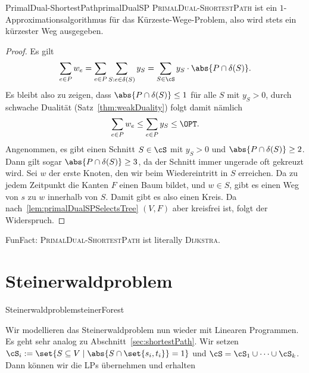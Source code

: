 \documentclass[language=ngerman,algolist]{TemplateLecture}
\begin{document}
\begin{thm}{PrimalDual-ShortestPath}{primalDualSP}
    \textsc{PrimalDual-ShortestPath} ist ein $1$-Approximationsalgorithmus für das Kürzeste-Wege-Problem, also wird stets ein kürzester Weg ausgegeben.
\end{thm}

\begin{proof}
    Es gilt 
    \begin{equation*}
        \sum_{e \in P} w_e = \sum_{e \in P} \sum_{S: e \in \delta(S)} y_S = \sum_{S \in \cS} y_S \cdot \abs{P \cap \delta(S)}. 
    \end{equation*}
    Es bleibt also zu zeigen, dass $\abs{P \cap \delta(S)} \leq 1$ für alle $S$ mit $y_S > 0$, durch schwache Dualität (Satz~\ref{thm:weakDuality}) folgt damit nämlich
    \begin{equation*}
        \sum_{e \in P} w_e \leq \sum_{e \in P} y_S \leq \OPT.
    \end{equation*}
    Angenommen, es gibt einen Schnitt $S \in \cS$ mit $y_S > 0$ und $\abs{P \cap \delta(S)} \geq 2$. Dann gilt sogar $\abs{P \cap \delta(S)} \geq 3$, da der Schnitt immer ungerade oft gekreuzt wird. Sei $w$ der erste Knoten, den wir beim Wiedereintritt in $S$ erreichen. Da zu jedem Zeitpunkt die Kanten $F$ einen Baum bildet, und $w \in S$, gibt es einen Weg von $s$ zu $w$ innerhalb von $S$. Damit gibt es also einen Kreis. Da nach~\ref{lem:primalDualSPSelectsTree} $(V, F)$ aber kreisfrei ist, folgt der Widerspruch. 
\end{proof}

FunFact: \textsc{PrimalDual-ShortestPath} ist literally \textsc{Dijkstra}.

\section{Steinerwaldproblem}

\begin{prob}{Steinerwaldproblem}{steinerForest}
\end{prob}

Wir modellieren das Steinerwaldproblem nun wieder mit Linearen Programmen. Es geht sehr analog zu Abschnitt~\ref{sec:shortestPath}. Wir setzen $\cS_i := \set{S \subseteq V \mid \abs{S \cap \set{s_i, t_i}} = 1}$ und $\cS = \cS_1 \cup \dots \cup \cS_k$. Dann können wir die LPs übernehmen und erhalten
\end{document}
